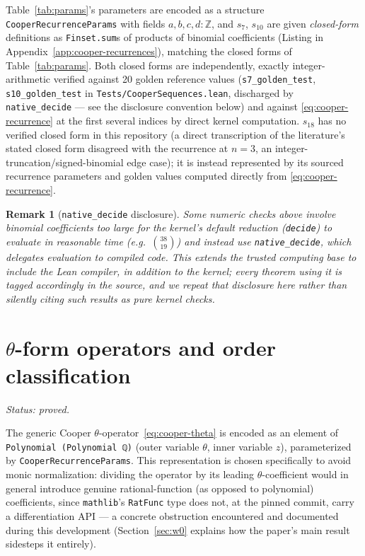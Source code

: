 \documentclass[11pt]{article}
\newtheorem{remark}[theorem]{Remark}
\begin{document}
Table~\ref{tab:params}'s parameters are encoded as a structure
\lstinline{CooperRecurrenceParams} with fields $a,b,c,d : \mathbb{Z}$, and
$s_7$, $s_{10}$ are given \emph{closed-form} definitions as
\texttt{Finset.sum}s of products of binomial coefficients (Listing in
Appendix~\ref{app:cooper-recurrences}), matching the closed forms of
Table~\ref{tab:params}. Both closed forms are independently, exactly
integer-arithmetic verified against 20 golden reference values
(\lstinline{s7_golden_test}, \lstinline{s10_golden_test} in
\texttt{Tests/CooperSequences.lean}, discharged by \texttt{native\_decide} ---
see the disclosure convention below) and against \eqref{eq:cooper-recurrence}
at the first several indices by direct kernel computation. $s_{18}$ has no
verified closed form in this repository (a direct transcription of the
literature's stated closed form disagreed with the recurrence at $n=3$, an
integer-truncation/signed-binomial edge case); it is instead represented by
its sourced recurrence parameters and golden values computed directly from
\eqref{eq:cooper-recurrence}.

\begin{remark}[\texttt{native\_decide} disclosure]
Some numeric checks above involve binomial coefficients too large for the
kernel's default reduction (\texttt{decide}) to evaluate in reasonable time
(e.g.\ $\binom{38}{19}$) and instead use \texttt{native\_decide}, which
delegates evaluation to compiled code. This extends the trusted computing
base to include the Lean compiler, in addition to the kernel; every theorem
using it is tagged accordingly in the source, and we repeat that disclosure
here rather than silently citing such results as pure kernel checks.
\end{remark}

\section{$\theta$-form operators and order classification}
\label{sec:theta}

\emph{Status: proved.}

The generic Cooper $\theta$-operator~\eqref{eq:cooper-theta} is encoded as an
element of \lstinline{Polynomial (Polynomial ℚ)} (outer variable $\theta$,
inner variable $z$), parameterized by \lstinline{CooperRecurrenceParams}. This
representation is chosen specifically to avoid monic normalization: dividing
the operator by its leading $\theta$-coefficient would in general introduce
genuine rational-function (as opposed to polynomial) coefficients, since
\texttt{mathlib}'s \lstinline{RatFunc} type does not, at the pinned commit,
carry a differentiation API --- a concrete obstruction encountered and
documented during this development (Section~\ref{sec:w0} explains how the
paper's main result sidesteps it entirely).
\end{document}
